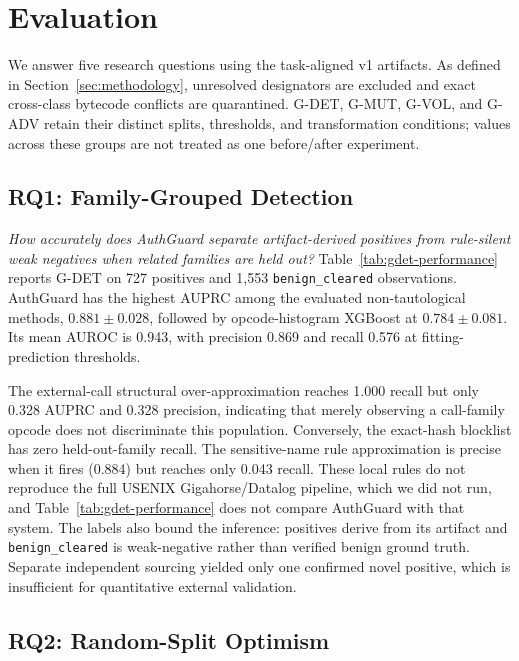 \section{Evaluation}
\label{sec:evaluation}

We answer five research questions using the task-aligned v1 artifacts. As defined in Section~\ref{sec:methodology}, unresolved designators are excluded and exact cross-class bytecode conflicts are quarantined. G-DET, G-MUT, G-VOL, and G-ADV retain their distinct splits, thresholds, and transformation conditions; values across these groups are not treated as one before/after experiment.

\subsection{RQ1: Family-Grouped Detection}

\emph{How accurately does AuthGuard separate artifact-derived positives from rule-silent weak negatives when related families are held out?} Table~\ref{tab:gdet-performance} reports G-DET on 727 positives and 1,553 \texttt{benign\_cleared} observations. AuthGuard has the highest AUPRC among the evaluated non-tautological methods, $0.881\pm0.028$, followed by opcode-histogram XGBoost at $0.784\pm0.081$. Its mean AUROC is 0.943, with precision 0.869 and recall 0.576 at fitting-prediction thresholds.



The external-call structural over-approximation reaches 1.000 recall but only 0.328 AUPRC and 0.328 precision, indicating that merely observing a call-family opcode does not discriminate this population. Conversely, the exact-hash blocklist has zero held-out-family recall. The sensitive-name rule approximation is precise when it fires (0.884) but reaches only 0.043 recall. These local rules do not reproduce the full USENIX Gigahorse/Datalog pipeline, which we did not run, and Table~\ref{tab:gdet-performance} does not compare AuthGuard with that system. The labels also bound the inference: positives derive from its artifact and \texttt{benign\_cleared} is weak-negative rather than verified benign ground truth. Separate independent sourcing yielded only one confirmed novel positive, which is insufficient for quantitative external validation.

\subsection{RQ2: Random-Split Optimism}


